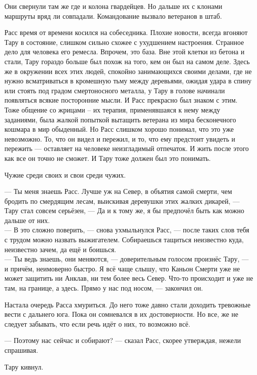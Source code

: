 Они свернули там же где и колона гвардейцев. Но дальше их с клонами маршруты 
вряд ли совпадали. Командование вызвало ветеранов в штаб.

Расс время от времени косился на собеседника. Плохие новости, всегда вгоняют 
Тару в состояние, слишком сильно схожее с ухудшением настроения. Странное дело 
для человека его ремесла. Впрочем, это база. Вне этой клетки из бетона и стали, 
Тару гораздо больше был похож на того, кем он был на самом деле. Здесь же в 
окружении всех этих людей, спокойно занимающихся своими делами, где не нужно 
всматриваться в кромешную тьму между деревьями, ожидая удара в спину или стоять 
под градом смертоносного металла, у Тару в голове начинали появляться всякие 
посторонние мысли. И Расс прекрасно был знаком с этим. Тоже общение со жрицами – 
их терапия, применявшаяся к нему между заданиями, была жалкой попыткой вытащить 
ветерана из мира бесконечного кошмара в мир обыденный. Но Расс слишком хорошо 
понимал, что это уже невозможно. То, что он видел и пережил, и то, что ему 
предстоит увидеть и пережить --- оставляет на человеке неизгладимый отпечаток. 
И жить после этого как все он точно не сможет. И Тару тоже должен был это 
понимать.

Чужие среди своих и свои среди чужих.

\noindent --- Ты меня знаешь Расс. Лучше уж на Север, в объятия самой смерти, 
чем бродить по смердящим лесам, выискивая деревушки этих жалких дикарей, --- 
Тару стал совсем серьёзен, --- Да и к тому же, я бы предпочёл быть как можно 
дальше от них.\\
--- В это сложно поверить, --- снова ухмыльнулся Расс, --- после таких слов 
тебя с трудом можно назвать выжигателем. Собираешься тащиться неизвестно куда, 
неизвестно зачем, да ещё и боишься.\\
--- Ты ведь знаешь, они меняются, --- доверительным голосом произнёс Тару, --- 
и причём, неимоверно быстро. Я всё чаще слышу, что Каньон Смерти уже не может 
защитить ни Анклав, ни тем более весь Север. Что-то происходит и уже не там, на 
границе, а здесь. Прямо у нас под носом, --- закончил он.

Настала очередь Расса хмуриться. До него тоже давно стали доходить тревожные 
вести с дальнего юга. Пока он сомневался в их достоверности. Но все, же не 
следует забывать, что если речь идёт о них, то возможно всё.

\noindent --- Поэтому нас сейчас и собирают? --- сказал Расс, скорее утверждая, 
нежели спрашивая.

Тару кивнул.

